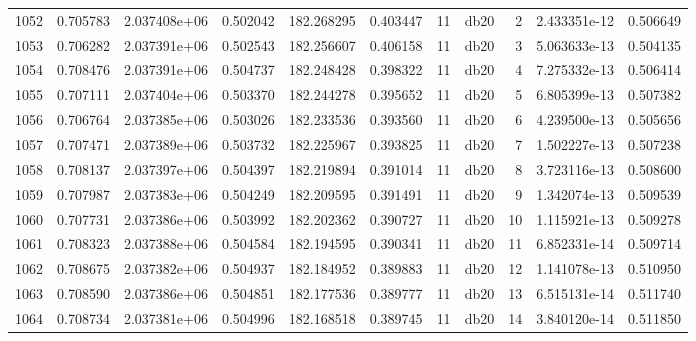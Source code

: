 \begin{tabular}{lrrrrrrlrrr}
1052 &    0.705783 &        2.037408e+06 &  0.502042 &              182.268295 &    0.403447 &      11 &         db20 &      2 &   2.433351e-12 &      0.506649 \\
1053 &    0.706282 &        2.037391e+06 &  0.502543 &              182.256607 &    0.406158 &      11 &         db20 &      3 &   5.063633e-13 &      0.504135 \\
1054 &    0.708476 &        2.037391e+06 &  0.504737 &              182.248428 &    0.398322 &      11 &         db20 &      4 &   7.275332e-13 &      0.506414 \\
1055 &    0.707111 &        2.037404e+06 &  0.503370 &              182.244278 &    0.395652 &      11 &         db20 &      5 &   6.805399e-13 &      0.507382 \\
1056 &    0.706764 &        2.037385e+06 &  0.503026 &              182.233536 &    0.393560 &      11 &         db20 &      6 &   4.239500e-13 &      0.505656 \\
1057 &    0.707471 &        2.037389e+06 &  0.503732 &              182.225967 &    0.393825 &      11 &         db20 &      7 &   1.502227e-13 &      0.507238 \\
1058 &    0.708137 &        2.037397e+06 &  0.504397 &              182.219894 &    0.391014 &      11 &         db20 &      8 &   3.723116e-13 &      0.508600 \\
1059 &    0.707987 &        2.037383e+06 &  0.504249 &              182.209595 &    0.391491 &      11 &         db20 &      9 &   1.342074e-13 &      0.509539 \\
1060 &    0.707731 &        2.037386e+06 &  0.503992 &              182.202362 &    0.390727 &      11 &         db20 &     10 &   1.115921e-13 &      0.509278 \\
1061 &    0.708323 &        2.037388e+06 &  0.504584 &              182.194595 &    0.390341 &      11 &         db20 &     11 &   6.852331e-14 &      0.509714 \\
1062 &    0.708675 &        2.037382e+06 &  0.504937 &              182.184952 &    0.389883 &      11 &         db20 &     12 &   1.141078e-13 &      0.510950 \\
1063 &    0.708590 &        2.037386e+06 &  0.504851 &              182.177536 &    0.389777 &      11 &         db20 &     13 &   6.515131e-14 &      0.511740 \\
1064 &    0.708734 &        2.037381e+06 &  0.504996 &              182.168518 &    0.389745 &      11 &         db20 &     14 &   3.840120e-14 &      0.511850 \\

\end{tabular}

